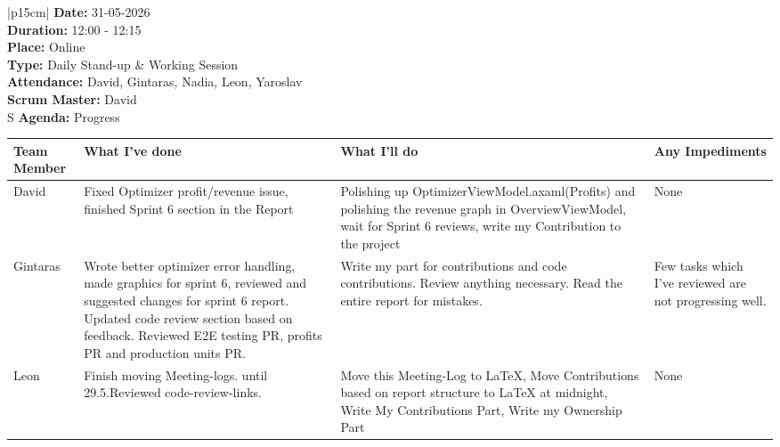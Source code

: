 \begin{table}[H]
    \centering
    \begin{tabular}{|p{15cm}|}   
        \hline
        \textbf{Date:}  31-05-2026 \\
        \textbf{Duration:}  12:00 - 12:15 \\
        \textbf{Place:}  Online\\
        \textbf{Type:} Daily Stand-up \& Working Session \\
        \textbf{Attendance:}  David, Gintaras, Nadia, Leon, Yaroslav\\
        \textbf{Scrum Master:}  David \\S
        \textbf{Agenda:} Progress
        \begin{table}[H]
            \begin{tabular}{|p{1.75cm}|p{4cm}|p{4cm}|p{4cm}|}
                \hline
                \cellcolor[HTML]{BFBFBF}  \textbf{Team Member} & \cellcolor[HTML]{BFBFBF}  \textbf{What I've done} & \cellcolor[HTML]{BFBFBF}  \textbf{What I'll do} & \cellcolor[HTML]{BFBFBF}  \textbf{Any Impediments}\\
                \hline
                \cellcolor[HTML]{d4d4d4} David & Fixed Optimizer profit/revenue issue, finished Sprint 6 section in the Report & Polishing up OptimizerViewModel.axaml(Profits) and polishing the revenue graph in OverviewViewModel, wait for Sprint 6 reviews, write my Contribution to the project & None \\
                \hline
                \cellcolor[HTML]{d4d4d4} Gintaras & Wrote better optimizer error handling, made graphics for sprint 6, reviewed and suggested changes for sprint 6 report. Updated code review section based on feedback. Reviewed E2E testing PR, profits PR and production units PR. & Write my part for contributions and code contributions. Review anything necessary. Read the entire report for mistakes. & Few tasks which I’ve reviewed are not progressing well. \\
                \hline
                \cellcolor[HTML]{d4d4d4} Leon & Finish moving Meeting-logs. until 29.5.\newline Reviewed code-review-links. & Move this Meeting-Log to LaTeX, Move Contributions based on report structure to LaTeX at midnight, Write My Contributions Part, Write my Ownership Part & None \\
                \hline    
            \end{tabular}
        \end{table} \\
        \hline
    \end{tabular}
\end{table}

